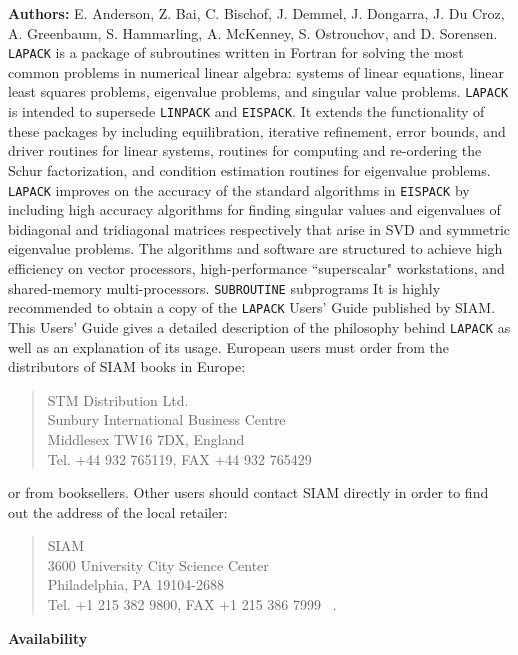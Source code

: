                          
                       
                  
                       \Revised{}
{\bf Authors:} E. Anderson, Z. Bai, C. Bischof, J. Demmel,
 J. Dongarra, J. Du Croz, A. Greenbaum, S. Hammarling, A. McKenney,
  S. Ostrouchov, and D. Sorensen. \\[3mm]
{\tt LAPACK} is
a package of subroutines written in Fortran for solving
the most common problems in numerical linear algebra:
systems of linear equations, linear least squares problems,
eigenvalue problems, and singular value problems.
{\tt LAPACK} is intended to supersede
{\tt LINPACK} and {\tt EISPACK}.
It extends the functionality of these packages by including
equilibration, iterative refinement, error bounds, and driver routines
for linear systems, routines for computing and re-ordering the Schur
factorization, and condition estimation routines for eigenvalue
problems. {\tt LAPACK} improves on the accuracy of the standard
algorithms in {\tt EISPACK} by including high accuracy algorithms for
finding singular values and eigenvalues of bidiagonal and tridiagonal
matrices respectively that arise in SVD and symmetric eigenvalue
problems.
The algorithms and software are structured to achieve high
efficiency on vector processors, high-performance ``superscalar"
workstations, and shared-memory multi-processors.
\Structure
{\tt SUBROUTINE} subprograms
\Usage
It is highly recommended to obtain a copy of the
{\tt LAPACK} Users' Guide published by SIAM.
This Users' Guide gives a detailed description of the
philosophy behind
{\tt LAPACK} as well as an explanation of its usage.
European users must order from the distributors
of SIAM books in Europe:
\begin{quote}
  STM Distribution Ltd.                   \\
  Sunbury International Business Centre   \\
  Middlesex TW16 7DX, England             \\
  Tel. +44 932 765119, \quad FAX +44 932 765429     \\
\end{quote}
or from booksellers.
Other users should contact SIAM directly in order to find out
the address of the local retailer:
\begin{quote}
  SIAM                                    \\
  3600 University City Science Center     \\
  Philadelphia, PA 19104-2688             \\
  Tel. +1 215 382 9800, \quad FAX +1 215 386 7999 \ .         \\
\end{quote}
{\bf   Availability}
 
